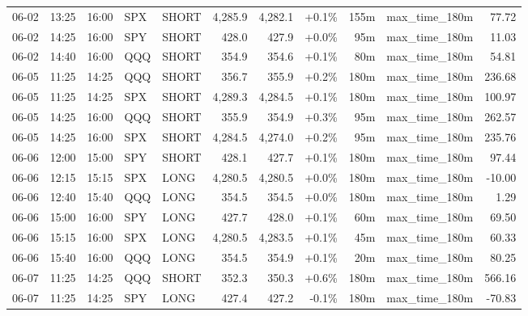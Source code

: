 \documentclass[11pt,a4paper,twoside]{article}
\begin{document}
\begin{center}
\begin{longtable}{>{\color{txtmain}}l l l l l r r r r >{\color{txtmain}}l r}
06-02 & 13:25 & 16:00 & SPX & SHORT & 4,285.9 & 4,282.1 & \textcolor{wingreen}{+0.1\%} & 155m & max\_time\_180m & \textcolor{wingreen}{77.72} \\
06-02 & 14:25 & 16:00 & SPY & SHORT & 428.0 & 427.9 & \textcolor{wingreen}{+0.0\%} & 95m & max\_time\_180m & \textcolor{wingreen}{11.03} \\
06-02 & 14:40 & 16:00 & QQQ & SHORT & 354.9 & 354.6 & \textcolor{wingreen}{+0.1\%} & 80m & max\_time\_180m & \textcolor{wingreen}{54.81} \\
06-05 & 11:25 & 14:25 & QQQ & SHORT & 356.7 & 355.9 & \textcolor{wingreen}{+0.2\%} & 180m & max\_time\_180m & \textcolor{wingreen}{236.68} \\
06-05 & 11:25 & 14:25 & SPX & SHORT & 4,289.3 & 4,284.5 & \textcolor{wingreen}{+0.1\%} & 180m & max\_time\_180m & \textcolor{wingreen}{100.97} \\
06-05 & 14:25 & 16:00 & QQQ & SHORT & 355.9 & 354.9 & \textcolor{wingreen}{+0.3\%} & 95m & max\_time\_180m & \textcolor{wingreen}{262.57} \\
06-05 & 14:25 & 16:00 & SPX & SHORT & 4,284.5 & 4,274.0 & \textcolor{wingreen}{+0.2\%} & 95m & max\_time\_180m & \textcolor{wingreen}{235.76} \\
06-06 & 12:00 & 15:00 & SPY & SHORT & 428.1 & 427.7 & \textcolor{wingreen}{+0.1\%} & 180m & max\_time\_180m & \textcolor{wingreen}{97.44} \\
06-06 & 12:15 & 15:15 & SPX & LONG & 4,280.5 & 4,280.5 & \textcolor{wingreen}{+0.0\%} & 180m & max\_time\_180m & \textcolor{lossred}{-10.00} \\
06-06 & 12:40 & 15:40 & QQQ & LONG & 354.5 & 354.5 & \textcolor{wingreen}{+0.0\%} & 180m & max\_time\_180m & \textcolor{wingreen}{1.29} \\
06-06 & 15:00 & 16:00 & SPY & LONG & 427.7 & 428.0 & \textcolor{wingreen}{+0.1\%} & 60m & max\_time\_180m & \textcolor{wingreen}{69.50} \\
06-06 & 15:15 & 16:00 & SPX & LONG & 4,280.5 & 4,283.5 & \textcolor{wingreen}{+0.1\%} & 45m & max\_time\_180m & \textcolor{wingreen}{60.33} \\
06-06 & 15:40 & 16:00 & QQQ & LONG & 354.5 & 354.9 & \textcolor{wingreen}{+0.1\%} & 20m & max\_time\_180m & \textcolor{wingreen}{80.25} \\
06-07 & 11:25 & 14:25 & QQQ & SHORT & 352.3 & 350.3 & \textcolor{wingreen}{+0.6\%} & 180m & max\_time\_180m & \textcolor{wingreen}{566.16} \\
06-07 & 11:25 & 14:25 & SPY & LONG & 427.4 & 427.2 & \textcolor{lossred}{-0.1\%} & 180m & max\_time\_180m & \textcolor{lossred}{-70.83} \\

\end{longtable}
\end{center}
\end{document}
